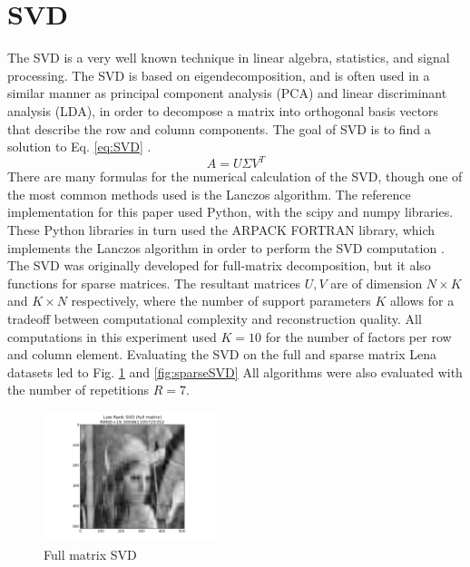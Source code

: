 \documentclass[journal]{IEEEtran}
\begin{document}
\section{SVD}
The SVD is a very well known technique in linear algebra, statistics, and signal processing. The SVD is based on eigendecomposition, and is often used 
in a similar manner as principal component analysis (PCA) and linear discriminant analysis (LDA), in order to decompose a matrix into 
orthogonal basis vectors that describe the row and column components. The goal of SVD is to find a solution to Eq. \ref{eq:SVD} \cite{SVDIntuition}.
\begin{equation}
    A=U \Sigma V^T
\label{eq:SVD}
\end{equation}
There are many formulas for the numerical calculation of the SVD, though one of the most common methods used is the Lanczos
algorithm. The reference implementation for this paper used Python, with the scipy and numpy libraries. These Python libraries in turn used 
the ARPACK FORTRAN library, which implements the Lanczos algorithm in order to perform the SVD computation \cite{SCIPYsource} \cite{ARPACKsource}. 
The SVD was originally developed for full-matrix decomposition, but it also functions for sparse matrices. 
The resultant matrices \begin{math}U,V\end{math} are of dimension \begin{math}N \times K\end{math} and \begin{math}K \times N\end{math} respectively, where the number of support parameters
\begin{math}K\end{math} allows for a tradeoff between computational complexity and reconstruction quality. All computations in this experiment used
\begin{math}K=10\end{math} for the number of factors per row and column element. Evaluating the SVD on the full and sparse matrix Lena datasets led to 
Fig. \ref{fig:fullSVD} and \ref{fig:sparseSVD} All algorithms were also evaluated with the number of repetitions \begin{math}R = 7\end{math}.
\begin{figure}[h!]
\centering
    \includegraphics[width=0.45\textwidth]{fullsvd.png}
    \caption{Full matrix SVD}
    \label{fig:fullSVD}
\end{figure}
\end{document}
